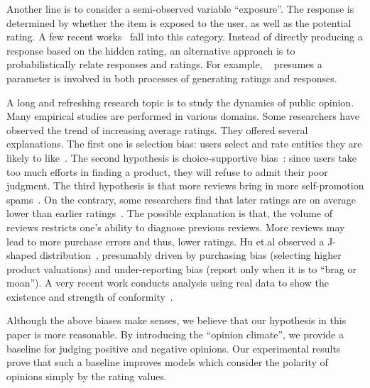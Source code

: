 \documentclass[sigconf]{acmart}
\begin{document}
Another line is to consider a semi-observed variable ``exposure''. The response is determined by whether the item is exposed to the user, as well as the potential rating. A few recent works~\cite{Liang2016Modeling,Gopalan2015Scalable} fall into this category. Instead of directly producing a response based on the hidden rating, an alternative approach is to probabilistically relate responses and ratings. For example, ~\cite{Ohsawa2016Gated} presumes a parameter is involved in both processes of generating ratings and responses. 

A long and refreshing research topic is to study the dynamics of public opinion. Many empirical studies are performed in various domains. Some researchers have observed the trend of increasing average ratings. They offered several explanations. The first one is selection bias: users select and rate entities they are likely to like~\cite{Dalvi2013Para}. The second hypothesis is choice-supportive bias~\cite{Cohen1970dissonance}: since users take too much efforts in finding a product, they will refuse to admit their poor judgment. The third hypothesis is that more reviews bring in more self-promotion spams~\cite{Jindal2008Opinion}. On the contrary, some researchers find that later ratings are on average lower than earlier ratings~\cite{Godes2012Sequential}. The possible explanation is that, the volume of reviews restricts one's ability to diagnose previous reviews. More reviews may lead to more purchase errors and thus, lower ratings. Hu et.al observed a J-shaped distribution~\cite{Hu2009Overcoming}, presumably driven by purchasing bias (selecting higher product valuations) and under-reporting bias (report only when it is to ``brag or moan''). A very recent work conducts analysis using real data to show the existence and strength of conformity~\cite{Liu2016Are}.

Although the above biases make senses, we believe that our hypothesis in this paper is more reasonable. By introducing the ``opinion climate'', we provide a baseline for judging positive and negative opinions. Our experimental results prove that such a baseline improves models which consider the polarity of opinions simply by the rating values.
\end{document}
